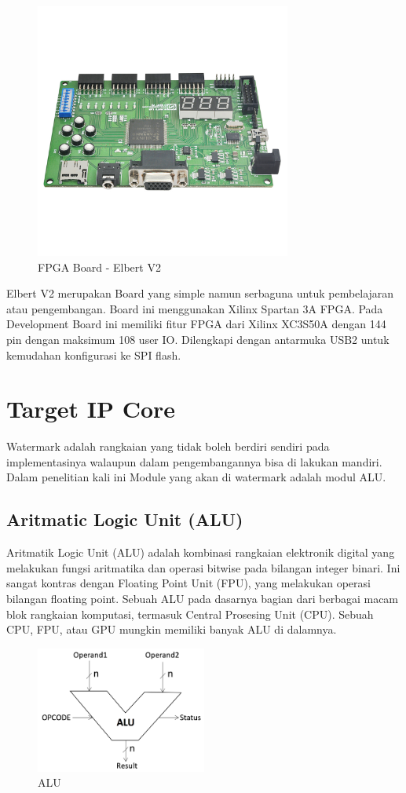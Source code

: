 \begin{figure}
	\centering
	\includegraphics[width=0.75\textwidth]
	{pics/elbertv2.jpg}
	\caption{FPGA Board - Elbert V2}
	\label{fig:fpga}
\end{figure}

Elbert V2 merupakan Board yang simple namun serbaguna untuk pembelajaran atau pengembangan. Board ini menggunakan Xilinx Spartan 3A FPGA. Pada Development Board ini memiliki fitur FPGA dari Xilinx XC3S50A dengan 144 pin dengan maksimum 108 user IO. Dilengkapi dengan antarmuka USB2 untuk kemudahan konfigurasi ke SPI flash. 

% 

\section{Target IP Core}
Watermark adalah rangkaian yang tidak boleh berdiri sendiri pada implementasinya walaupun dalam pengembangannya bisa di lakukan mandiri. Dalam penelitian kali ini Module yang akan di watermark adalah modul ALU.

\subsection{Aritmatic Logic Unit (ALU)}
Aritmatik Logic Unit (ALU) adalah kombinasi rangkaian elektronik digital yang melakukan fungsi aritmatika dan operasi bitwise pada bilangan integer binari. Ini sangat kontras dengan Floating Point Unit (FPU), yang melakukan operasi bilangan floating point. Sebuah ALU pada dasarnya bagian dari berbagai macam blok rangkaian komputasi, termasuk Central Prosesing Unit (CPU). Sebuah CPU, FPU, atau GPU mungkin memiliki banyak ALU di dalamnya.

\begin{figure}
	\centering
	\includegraphics[width=0.5\textwidth]
	{pics/alu.png}
	\caption{ALU}
	\label{alu}
\end{figure}

